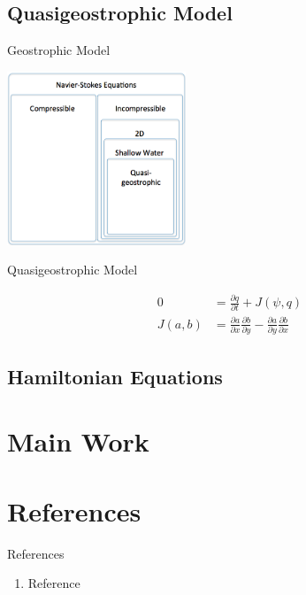 \documentclass{beamer}
\begin{document}
		\subsection{Quasigeostrophic Model}
			\begin{frame}[t]{Geostrophic Model}
				\begin{center}
					\includegraphics[width=0.4\textwidth]{nested_models_qg.png}
				\end{center}
			\end{frame}
			\begin{frame}[t]{Quasigeostrophic Model}
				\begin{center}
					\begin{align*}
						0 &=\frac{\partial q}{\partial t} + J(\psi, q) \\
						J(a, b) &=\frac{\partial a}{\partial x}\frac{\partial b}{\partial y} - \frac{\partial a}{\partial y}\frac{\partial b}{\partial x}
					\end{align*}
				\end{center}
			\end{frame}
		\subsection{Hamiltonian Equations}

	\section{Main Work}

	\section{References}
		\begin{frame}{References}
			\begin{enumerate}
				\item Reference
			\end{enumerate}
		\end{frame}
\end{document}
